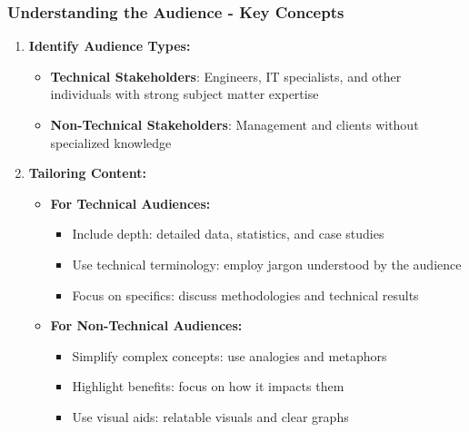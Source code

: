 \documentclass{beamer}
\begin{document}
\begin{frame}[fragile]
    \frametitle{Understanding the Audience - Key Concepts}
    \begin{enumerate}
        \item \textbf{Identify Audience Types:}
        \begin{itemize}
            \item \textbf{Technical Stakeholders}: Engineers, IT specialists, and other individuals with strong subject matter expertise
            \item \textbf{Non-Technical Stakeholders}: Management and clients without specialized knowledge
        \end{itemize}
        
        \item \textbf{Tailoring Content:}
        \begin{itemize}
            \item \textbf{For Technical Audiences:}
                \begin{itemize}
                    \item Include depth: detailed data, statistics, and case studies
                    \item Use technical terminology: employ jargon understood by the audience
                    \item Focus on specifics: discuss methodologies and technical results
                \end{itemize}
            
            \item \textbf{For Non-Technical Audiences:}
                \begin{itemize}
                    \item Simplify complex concepts: use analogies and metaphors
                    \item Highlight benefits: focus on how it impacts them
                    \item Use visual aids: relatable visuals and clear graphs
                \end{itemize}
        \end{itemize}
    \end{enumerate}
\end{frame}
\end{document}
